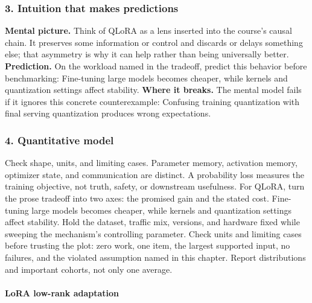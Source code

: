 \subsubsection*{3. Intuition that makes predictions}
\textbf{Mental picture.} Think of QLoRA as a lens inserted into the course's causal chain. It preserves some information or control and discards or delays something else; that asymmetry is why it can help rather than being universally better.
\textbf{Prediction.} On the workload named in the tradeoff, predict this behavior before benchmarking: Fine-tuning large models becomes cheaper, while kernels and quantization settings affect stability.
\textbf{Where it breaks.} The mental model fails if it ignores this concrete counterexample: Confusing training quantization with final serving quantization produces wrong expectations.
\subsubsection*{4. Quantitative model}
Check shape, units, and limiting cases. Parameter memory, activation memory, optimizer state, and communication are distinct. A probability loss measures the training objective, not truth, safety, or downstream usefulness.
For QLoRA, turn the prose tradeoff into two axes: the promised gain and the stated cost. Fine-tuning large models becomes cheaper, while kernels and quantization settings affect stability. Hold the dataset, traffic mix, versions, and hardware fixed while sweeping the mechanism's controlling parameter.
Check units and limiting cases before trusting the plot: zero work, one item, the largest supported input, no failures, and the violated assumption named in this chapter. Report distributions and important cohorts, not only one average.
\paragraph{LoRA low-rank adaptation}
